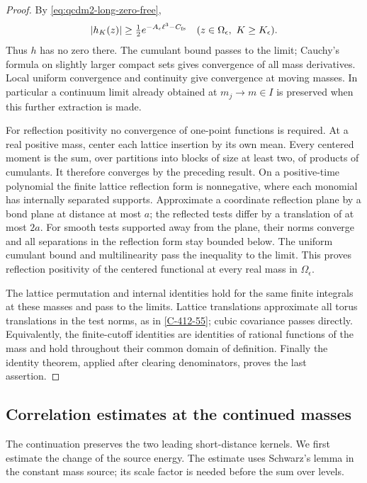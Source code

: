 \documentclass[11pt,letterpaper,reqno]{amsart}
\theoremstyle{definition}
\theoremstyle{remark}
\begin{document}
\begin{proof}
By \eqref{eq:qcdm2-long-zero-free},
\[
 |h_K(z)|\ge\tfrac12e^{-A_\epsilon\ell^3-C_{\rm fs}}
                 \quad(z\in\Omega_\epsilon,\ K\ge K_\epsilon).
\]
Thus \(h\) has no zero there.
The cumulant bound passes to the limit; Cauchy's formula
on slightly larger compact sets gives convergence of all
mass derivatives. Local uniform convergence and continuity
give convergence at moving masses. In particular a continuum
limit already obtained at \(m_j\to m\in I\) is preserved
when this further extraction is made.

For reflection positivity no convergence of one-point
functions is required. At a real positive mass, center each
lattice insertion by its own mean. Every centered moment
is the sum, over partitions into blocks of size at least two,
of products of cumulants. It therefore converges by the
preceding result. On a positive-time polynomial the finite
lattice reflection form is nonnegative, where each monomial
has internally separated supports. Approximate a
coordinate reflection plane by a bond plane at distance at
most \(a\); the reflected tests differ by a translation
of at most \(2a\). For smooth tests supported away from the
plane, their norms converge and all separations in the
reflection form stay bounded below. The uniform cumulant
bound and multilinearity pass the inequality to the limit.
This proves reflection positivity of the centered functional
at every real mass in \(\Omega_\epsilon\).

The lattice permutation and internal identities hold for
the same finite integrals at these masses and pass to the
limits. Lattice translations approximate all torus translations
in the test norms, as in \cref{C-412-55}; cubic covariance
passes directly. Equivalently, the finite-cutoff identities
are identities of rational functions of the mass and hold
throughout their common domain of definition.
Finally the identity theorem, applied after clearing
denominators, proves the last assertion.
\end{proof}

\subsection{Correlation estimates at the continued masses}

The continuation preserves the two leading short-distance
kernels. We first estimate the change of the source energy.
The estimate uses Schwarz's lemma in the constant mass source;
its scale factor is needed before the sum over levels.
\end{document}
